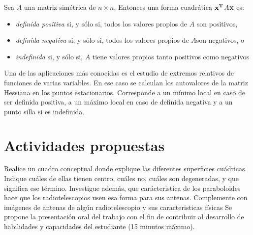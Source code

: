 Sea $A$ una matriz simétrica de $n \times n$. Entonces una forma cuadrática $\bf x ^T$$ A$$ \bf x$ es:

\begin{itemize}
    \item 

\textit{definida positiva} si, y sólo si, todos los valores propios de $A$ son positivos,

\item 
\textit{definida negativa} si, y sólo si, todos los valores propios de $A$son negativos, o

\item 
\textit{
indefinida} si, y sólo si, $A$ tiene valores propios tanto positivos como negativos
\end{itemize}
\begin{remark}
Una de las aplicaciones más conocidas es  el estudio de extremos relativos  de funciones de varias variables. En ese caso se calculan los autovalores de la matriz Hessiana en los puntos estacionarios. Corresponde a un mínimo local en caso de ser definida positiva, a un máximo local en caso de definida negativa y a un punto silla si es indefinida.
\end{remark}

\bigskip


\newpage






\section{Actividades propuestas}



\begin{answers}
Realice un cuadro conceptual donde explique las diferentes superficies cuádricas.
Indique cuáles de ellas tienen centro, cuáles no, cuáles son degeneradas, y que significa ese término.
Investigue además, que carácteristica de los paraboloides hace que los radiotelescopios usen esa forma para sus antenas.
Complemente con imágenes de antenas de algún radiotelescopio y sus caracteristicas físicas
Se propone la presentación  oral del trabajo  con el fin de contribuir al desarrollo de  habilidades y capacidades del estudiante (15 minutos máximo).

\end{answers}

